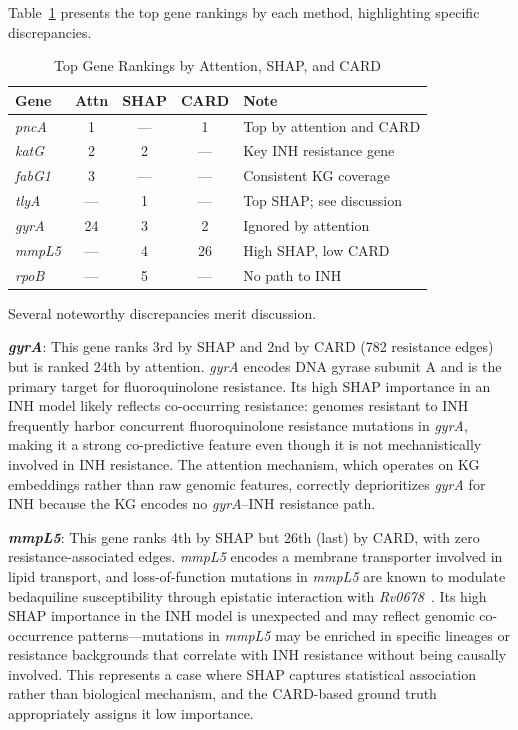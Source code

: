 \documentclass[conference]{IEEEtran}
\begin{document}
Table~\ref{tab:generank} presents the top gene rankings by each method, highlighting specific discrepancies.

\begin{table}[t]
\centering
\caption{Top Gene Rankings by Attention, SHAP, and CARD}
\label{tab:generank}
\begin{tabular}{lcccp{2.0cm}}
\toprule
\textbf{Gene} & \textbf{Attn} & \textbf{SHAP} & \textbf{CARD} & \textbf{Note} \\
\midrule
\textit{pncA}  & 1  & --- & 1  & Top by attention and CARD \\
\textit{katG}  & 2  & 2   & --- & Key INH resistance gene \\
\textit{fabG1} & 3  & --- & --- & Consistent KG coverage \\
\textit{tlyA}  & --- & 1  & --- & Top SHAP; see discussion \\
\textit{gyrA}  & 24 & 3   & 2  & Ignored by attention \\
\textit{mmpL5} & --- & 4  & 26 & High SHAP, low CARD \\
\textit{rpoB}  & --- & 5  & --- & No path to INH \\
\bottomrule
\end{tabular}
\end{table}

Several noteworthy discrepancies merit discussion.

\textbf{\textit{gyrA}}: This gene ranks 3rd by SHAP and 2nd by CARD (782 resistance edges) but is ranked 24th by attention. \textit{gyrA} encodes DNA gyrase subunit A and is the primary target for fluoroquinolone resistance. Its high SHAP importance in an INH model likely reflects co-occurring resistance: genomes resistant to INH frequently harbor concurrent fluoroquinolone resistance mutations in \textit{gyrA}, making it a strong co-predictive feature even though it is not mechanistically involved in INH resistance. The attention mechanism, which operates on KG embeddings rather than raw genomic features, correctly deprioritizes \textit{gyrA} for INH because the KG encodes no \textit{gyrA}--INH resistance path.

\textbf{\textit{mmpL5}}: This gene ranks 4th by SHAP but 26th (last) by CARD, with zero resistance-associated edges. \textit{mmpL5} encodes a membrane transporter involved in lipid transport, and loss-of-function mutations in \textit{mmpL5} are known to modulate bedaquiline susceptibility through epistatic interaction with \textit{Rv0678}~\cite{ref_mmpl5}. Its high SHAP importance in the INH model is unexpected and may reflect genomic co-occurrence patterns---mutations in \textit{mmpL5} may be enriched in specific lineages or resistance backgrounds that correlate with INH resistance without being causally involved. This represents a case where SHAP captures statistical association rather than biological mechanism, and the CARD-based ground truth appropriately assigns it low importance.
\end{document}
